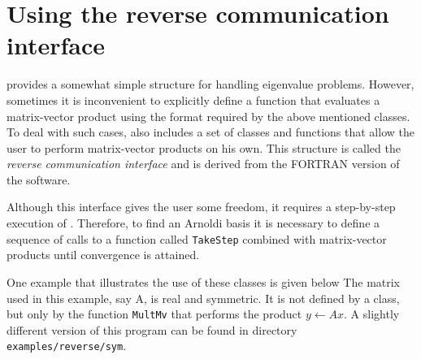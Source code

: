 \section{Using the reverse communication interface}

\ARPP{} provides a somewhat simple structure for handling eigenvalue problems. However, sometimes it is inconvenient to explicitly define a function that evaluates a matrix-vector product using the format required by the above mentioned classes. 
To deal with such cases, \ARPP{} also includes a set of classes and functions that allow the user to perform matrix-vector products on his own. This structure is called the \textit{reverse communication interface} and is derived from the FORTRAN version of the software.

Although this interface gives the user some freedom, it requires a step-by-step execution of \ARPP{}. Therefore, to find an Arnoldi basis it is necessary to define a sequence of calls to a function called \texttt{TakeStep} combined with matrix-vector products until convergence is attained.

One example that illustrates the use of these classes is given below The matrix used in this example, say A, is real and symmetric. It is not defined by a class, but only by the function \texttt{MultMv} that performs the product $y\leftarrow Ax$. A slightly different version of this program can be found in directory \texttt{examples/reverse/sym}.

